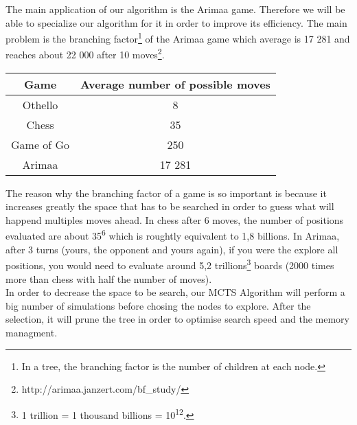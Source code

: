 The main application of our algorithm is the Arimaa game. Therefore we will be able to specialize our algorithm for it in order to improve its efficiency. The main problem is the branching factor\footnote{In a tree, the branching factor is the number of children at each node.} of the Arimaa game which average is 17 281 and reaches about 22 000 after 10 moves\footnote{http://arimaa.janzert.com/bf\_study/}.\\
\bigskip
\begin{center}
	\begin{tabular}{ | c | c |}
		\hline Game & Average number of possible moves \\ \hline
		\hline  
		Othello & 8\\
		\hline  
		Chess & 35\\
		\hline  
		Game of Go & 250\\
		\hline
		Arimaa & 17 281\\
		\hline
	\end{tabular}
\end{center}
\bigskip
The reason why the branching factor of a game is so important is because it increases greatly the space that has to be searched in order to guess what will happend multiples moves ahead. In chess after 6 moves, the number of positions evaluated are about 35\textsuperscript{6} which is roughtly equivalent to 1,8 billions. In Arimaa, after 3 turns (yours, the opponent and yours again), if you were the explore all positions, you would need to evaluate around 5,2 trillions\footnote{1 trillion = 1 thousand billions = 10\textsuperscript{12}.} boards (2000 times more than chess with half the number of moves).
\bigskip\\
In order to decrease the space to be search, our MCTS Algorithm will perform a big number of simulations before chosing the nodes to explore. After the selection, it will prune the tree in order to optimise search speed and the memory managment.


